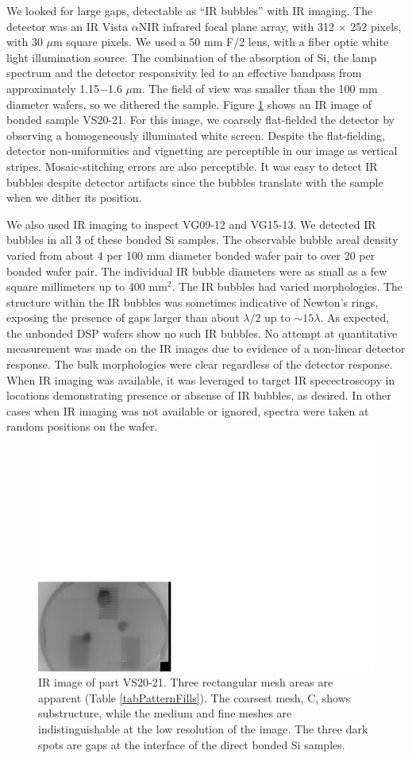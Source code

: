 \documentclass[osajnl,preprint,showpacs,superscriptaddress,12pt]{revtex4-1} %
\begin{document}
We looked for large gaps, detectable as ``IR bubbles'' \cite{1992JEMat..21..669M} with IR imaging.  The detector was an IR Vista $\alpha$NIR infrared focal plane array, with 312 $\times$ 252 pixels, with 30 $\mu$m square pixels.  We used a 50 mm F/2 lens, with a fiber optic white light illumination source.  The combination of the absorption of Si, the lamp spectrum and the detector responsivity led to an effective bandpass from approximately 1.15$-$1.6 $\mu$m.  The field of view was smaller than the 100 mm diameter wafers, so we dithered the sample.  Figure \ref{figVS2021_IR_image} shows an IR image of bonded sample VS20-21.  For this image, we coarsely flat-fielded the detector by observing a homogeneously illuminated white screen. Despite the flat-fielding, detector non-uniformities and vignetting are perceptible in our image as vertical stripes.  Mosaic-stitching errors are also perceptible.  It was easy to detect IR bubbles despite detector artifacts since the bubbles translate with the sample when we dither its position.  

We also used IR imaging to inspect VG09-12 and VG15-13.  We detected IR bubbles in all 3 of these bonded Si samples.  The observable bubble areal density varied from about 4 per 100 mm diameter bonded wafer pair to over 20 per bonded wafer pair.  The individual IR bubble diameters were as small as a few square millimeters up to 400 mm$^2$.  The IR bubbles had varied morphologies.  The structure within the IR bubbles was sometimes indicative of Newton's rings, exposing the presence of gaps larger than about $\lambda/2$ up to $\sim 15 \lambda$.  As expected, the unbonded DSP wafers show no such IR bubbles.  No attempt at quantitative measurement was made on the IR images due to evidence of a non-linear detector response.  The bulk morphologies were clear regardless of the detector response.  When IR imaging was available, it was leveraged to target IR specectroscopy in locations demonstrating presence or absense of IR bubbles, as desired.  In other cases when IR imaging was not available or ignored, spectra were taken at random positions on the wafer.

\begin{figure}[htbp]
\centerline{\includegraphics[width=0.4\columnwidth]{figs/VS2021_IR_image.pdf}}
\caption{
\label{figVS2021_IR_image}
IR image of part VS20-21. Three rectangular mesh areas are apparent (Table \ref{tabPatternFills}).  The coarsest mesh, C, shows substructure, while the medium and fine meshes are indistinguishable at the low resolution of the image.  The three dark spots are gaps at the interface of the direct bonded Si samples.}
\end{figure}
\end{document}
